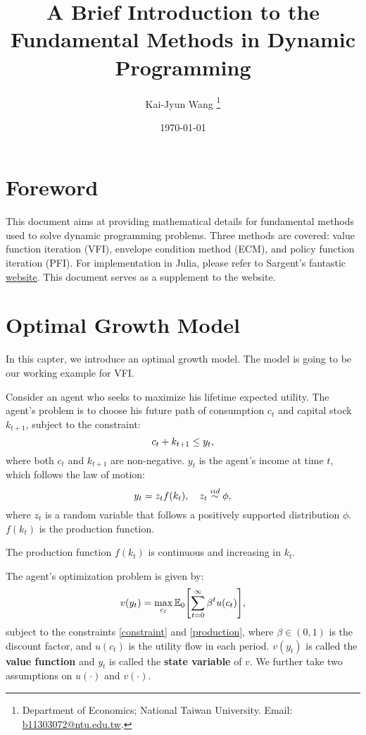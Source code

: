 \documentclass[12pt]{article}
\title{
    A Brief Introduction to the Fundamental Methods in Dynamic 
    Programming
    }
\author{%
   Kai-Jyun Wang
   \thanks{Department of Economics; National Taiwan University. 
   Email: \url{b11303072@ntu.edu.tw}.}
}
\date{\today}
\begin{document}

\maketitle

\section*{Foreword}
This document aims at providing mathematical details for fundamental 
methods used to solve dynamic programming problems. Three methods 
are covered: value function iteration (VFI), envelope condition method 
(ECM), and policy function iteration (PFI). For implementation in 
Julia, please refer to Sargent's fantastic 
\href{https://julia.quantecon.org/dynamic_programming/optgrowth.html}
{website}. This document serves as a supplement to the website.

\tableofcontents

\section{Optimal Growth Model}
In this capter, we introduce an optimal growth model. The model is 
going to be our working example for VFI. 

Consider an agent who seeks to maximize his lifetime expected utility. 
The agent's problem is to choose his future path of consumption $c_t$ 
and capital stock $k_{t+1}$, subject to the constraint: 
\begin{equation}\eqlab{constraint}
    c_t + k_{t+1} \leq y_t,
\end{equation} 
where both $c_t$ and $k_{t+1}$ are non-negative. $y_t$ is the agent's 
income at time $t$, which follows the law of motion: 
\begin{equation}\eqlab{production}
    y_t = z_t f(k_t),\quad z_t \overset{iid}{\sim} \phi,
\end{equation}
where $z_t$ is a random variable that follows a positively supported 
distribution $\phi$. $f(k_t)$ is the production function. 

\begin{assumption}
    The production function $f(k_t)$ is continuous and increasing in 
    $k_t$.
\end{assumption}

The agent's optimization problem is given by: 
\begin{equation}
    v(y_t) = \max_{c_t} \E_0\sbrc{\sum_{t=0}^{\infty} \beta^t u(c_t)},
\end{equation}
subject to the constraints \eqref{constraint} and \eqref{production},
where $\beta \in (0, 1)$ is the discount factor, and $u(c_t)$ is the 
utility flow in each period. $v(y_t)$ is called the \textbf{value 
function} and $y_t$ is called the \textbf{state variable} of $v$. We 
further take two assumptions on $u(\cdot)$ and $v(\cdot)$.
\end{document}
